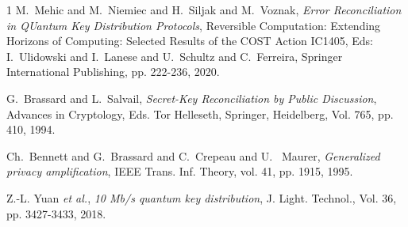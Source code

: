 \documentclass[journal,onecolumn]{IEEEtran}
\theoremstyle{thmstyleone}%
\theoremstyle{thmstyletwo}%
\theoremstyle{thmstylethree}%
\begin{document}
\begin{thebibliography}{1}
		M.~Mehic and M.~Niemiec and H.~Siljak and M.~Voznak, \emph{Error Reconciliation in QUantum Key Distribution Protocols}, Reversible Computation: Extending Horizons of Computing: Selected Results of the COST Action IC1405, Eds: I.~Ulidowski and I.~Lanese and U.~Schultz and C.~Ferreira, Springer International Publishing, pp. 222-236, 2020.
		
		
			G.~Brassard and  L.~Salvail,
			\emph{Secret-Key Reconciliation by Public Discussion}, Advances in Cryptology, Eds. Tor Helleseth, Springer, Heidelberg, Vol. 765, pp. 410, 1994. 
		
			Ch.~Bennett and G.~Brassard and C.~Crepeau and U.~ Maurer, \emph{Generalized privacy amplification}, IEEE Trans. Inf. Theory, vol. 41, pp. 1915, 1995.
		
			Z.-L. Yuan \emph{et al.}, \emph{10 Mb/s quantum key distribution}, J. Light. Technol., Vol. 36, pp. 3427-3433, 2018.
		
	
		
		
		
		
		
	\end{thebibliography}
	
	
	
	
	
	
	
	
	
	
\end{document}
